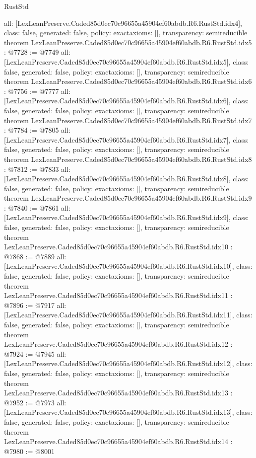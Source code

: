 \begin{lexlean}{RustStd}
\begin{coremodule}
{  all: [LexLeanPreserve.Caded85d0ec70c96655a45904ef60abdb.R6.RustStd.idx4],
  class: false,
  generated: false,
  policy: exact{axioms: []},
  transparency: semireducible
}
theorem LexLeanPreserve.Caded85d0ec70c96655a45904ef60abdb.R6.RustStd.idx5 : @7728 := @7749 {
  all: [LexLeanPreserve.Caded85d0ec70c96655a45904ef60abdb.R6.RustStd.idx5],
  class: false,
  generated: false,
  policy: exact{axioms: []},
  transparency: semireducible
}
theorem LexLeanPreserve.Caded85d0ec70c96655a45904ef60abdb.R6.RustStd.idx6 : @7756 := @7777 {
  all: [LexLeanPreserve.Caded85d0ec70c96655a45904ef60abdb.R6.RustStd.idx6],
  class: false,
  generated: false,
  policy: exact{axioms: []},
  transparency: semireducible
}
theorem LexLeanPreserve.Caded85d0ec70c96655a45904ef60abdb.R6.RustStd.idx7 : @7784 := @7805 {
  all: [LexLeanPreserve.Caded85d0ec70c96655a45904ef60abdb.R6.RustStd.idx7],
  class: false,
  generated: false,
  policy: exact{axioms: []},
  transparency: semireducible
}
theorem LexLeanPreserve.Caded85d0ec70c96655a45904ef60abdb.R6.RustStd.idx8 : @7812 := @7833 {
  all: [LexLeanPreserve.Caded85d0ec70c96655a45904ef60abdb.R6.RustStd.idx8],
  class: false,
  generated: false,
  policy: exact{axioms: []},
  transparency: semireducible
}
theorem LexLeanPreserve.Caded85d0ec70c96655a45904ef60abdb.R6.RustStd.idx9 : @7840 := @7861 {
  all: [LexLeanPreserve.Caded85d0ec70c96655a45904ef60abdb.R6.RustStd.idx9],
  class: false,
  generated: false,
  policy: exact{axioms: []},
  transparency: semireducible
}
theorem LexLeanPreserve.Caded85d0ec70c96655a45904ef60abdb.R6.RustStd.idx10 : @7868 := @7889 {
  all: [LexLeanPreserve.Caded85d0ec70c96655a45904ef60abdb.R6.RustStd.idx10],
  class: false,
  generated: false,
  policy: exact{axioms: []},
  transparency: semireducible
}
theorem LexLeanPreserve.Caded85d0ec70c96655a45904ef60abdb.R6.RustStd.idx11 : @7896 := @7917 {
  all: [LexLeanPreserve.Caded85d0ec70c96655a45904ef60abdb.R6.RustStd.idx11],
  class: false,
  generated: false,
  policy: exact{axioms: []},
  transparency: semireducible
}
theorem LexLeanPreserve.Caded85d0ec70c96655a45904ef60abdb.R6.RustStd.idx12 : @7924 := @7945 {
  all: [LexLeanPreserve.Caded85d0ec70c96655a45904ef60abdb.R6.RustStd.idx12],
  class: false,
  generated: false,
  policy: exact{axioms: []},
  transparency: semireducible
}
theorem LexLeanPreserve.Caded85d0ec70c96655a45904ef60abdb.R6.RustStd.idx13 : @7952 := @7973 {
  all: [LexLeanPreserve.Caded85d0ec70c96655a45904ef60abdb.R6.RustStd.idx13],
  class: false,
  generated: false,
  policy: exact{axioms: []},
  transparency: semireducible
}
theorem LexLeanPreserve.Caded85d0ec70c96655a45904ef60abdb.R6.RustStd.idx14 : @7980 := @8001 {
}
\end{coremodule}
\end{lexlean}
